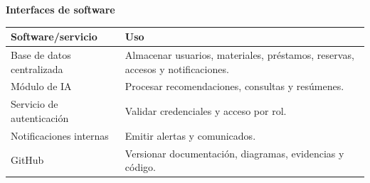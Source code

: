 \documentclass[12pt,journal,onecolumn]{IEEEtran}
\begin{document}
\medskip\noindent\textbf{Interfaces de software}\par\smallskip
\begin{tabularx}{\textwidth}{P{0.30\textwidth}Y}\toprule
\textbf{Software/servicio} & \textbf{Uso}\\\midrule
Base de datos centralizada & Almacenar usuarios, materiales, préstamos, reservas, accesos y notificaciones.\\
Módulo de IA & Procesar recomendaciones, consultas y resúmenes.\\
Servicio de autenticación & Validar credenciales y acceso por rol.\\
Notificaciones internas & Emitir alertas y comunicados.\\
GitHub & Versionar documentación, diagramas, evidencias y código.\\\bottomrule
\end{tabularx}
\end{document}
